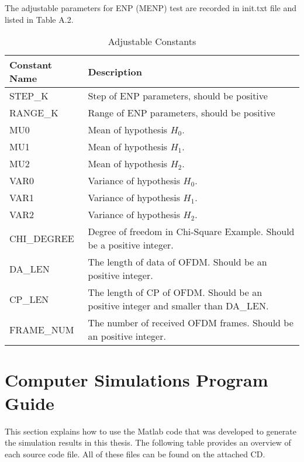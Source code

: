 The adjustable parameters for ENP (MENP) test are recorded in init.txt file and listed in Table A.2. 
\begin{table}[h]
\begin{tabular}{l|p{350pt}} 
\hline
\hline
Constant Name & Description                                                                                           \\
\hline
STEP\_K       & Step of ENP parameters, should be positive                                                            \\
RANGE\_K      & Range of ENP parameters, should be positive                                                           \\
MU0		  &  Mean of hypothesis $H_0$.\\
MU1		  & Mean of hypothesis $H_1$.\\
MU2       & Mean of hypothesis $H_2$.\\
VAR0      &    Variance of hypothesis $H_0$.\\
VAR1		&	Variance of hypothesis $H_1$.\\
VAR2		&		Variance of hypothesis $H_2$.\\
CHI\_DEGREE   & Degree of freedom in Chi-Square Example. Should be a positive integer.                                \\
DA\_LEN       & The length of data of OFDM. Should be an positive integer.                      \\
CP\_LEN       & The length of CP of OFDM. Should be an positive integer and smaller than DA\_LEN. \\
FRAME\_NUM    & The number of received OFDM frames. Should be an positive integer.\\
\hline                                   
\end{tabular}
\label{constantlist}
\caption{Adjustable Constants}
\end{table}


\chapter{Computer Simulations Program Guide}
\label{A:LaTeXmacros}


This section explains how to use the Matlab code that was developed to generate the simulation results in this thesis.  The following table provides an overview of each source code file. All of these files can be found on the attached CD. 

